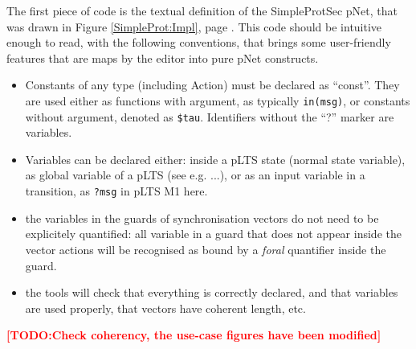 \documentclass{lmcs}
\newcommand{\TODO}[1]{\textcolor{red}{\textbf{[TODO:#1]}}}
\begin{document}


  

The first piece of code is the textual definition of the SimpleProtSec
pNet, that was drawn in Figure \ref{SimpleProt:Impl}, page \pageref{SimpleProt:Impl}. This code should be intuitive enough to read, with the following
conventions, that brings some user-friendly features that are maps by the editor into pure pNet constructs.

\begin{itemize}
  \item Constants of any type (including Action) must be declared as
    ``const''. They are used either as functions with argument, as
    typically \texttt{in(msg)}, or constants without argument, denoted
    as \texttt{\$tau}. Identifiers without the ``?'' marker are
    variables.
  \item Variables can be declared either: inside a pLTS state (normal
    state variable), as global variable of a pLTS (see e.g. ...), or
    as an input variable in a transition, as \texttt{?msg} in pLTS M1
    here.
  \item the variables in the guards of synchronisation vectors do not need to be explicitely quantified: all variable in a guard that does not appear inside the vector actions will be recognised as bound by a \emph{foral} quantifier inside the guard.
    \item the tools will check that everything is correctly declared, and that variables are used properly, that vectors have coherent length, etc.
\end{itemize}

\TODO{Check coherency, the use-case figures have been modified}
\end{document}
